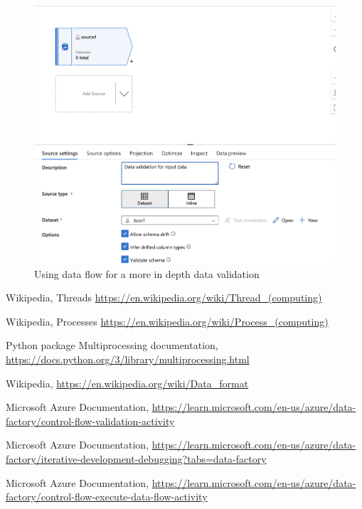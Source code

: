 \documentclass[11pt, oneside]{article}   	%
\begin{document}
\begin{figure}[H] %
   \centering
   \includegraphics[width=6in]{images/dataflow} 
   \caption{Using data flow for a more in depth data validation}
   \label{fig:dataflow}
\end{figure}


\clearpage


\begin{thebibliography}{9}

Wikipedia, Threads \href{https://en.wikipedia.org/wiki/Thread_(computing) }{\url{https://en.wikipedia.org/wiki/Thread_(computing)}}

Wikipedia, Processes \href{https://en.wikipedia.org/wiki/Process_(computing)}{\url{https://en.wikipedia.org/wiki/Process_(computing)}}

Python package Multiprocessing documentation, \href{https://docs.python.org/3/library/multiprocessing.html}{\url{https://docs.python.org/3/library/multiprocessing.html}}



Wikipedia, \href{https://en.wikipedia.org/wiki/Data_format }{\url{https://en.wikipedia.org/wiki/Data_format }}

Microsoft Azure Documentation, \href{https://learn.microsoft.com/en-us/azure/data-factory/control-flow-validation-activity}{\url{https://learn.microsoft.com/en-us/azure/data-factory/control-flow-validation-activity}}

Microsoft Azure Documentation, \href{https://learn.microsoft.com/en-us/azure/data-factory/iterative-development-debugging?tabs=data-factory}{\url{https://learn.microsoft.com/en-us/azure/data-factory/iterative-development-debugging?tabs=data-factory}}

Microsoft Azure Documentation, \href{https://learn.microsoft.com/en-us/azure/data-factory/control-flow-execute-data-flow-activity}{\url{https://learn.microsoft.com/en-us/azure/data-factory/control-flow-execute-data-flow-activity}}

\end{thebibliography}
\end{document}

